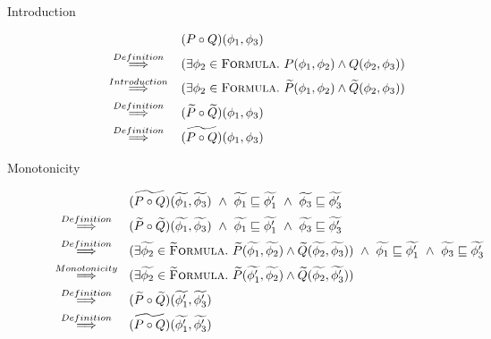 \begin{proofatend}~
    \begin{description}
        \item[Introduction] 
        \begin{align*}
        &(P \circ Q)(\phi_1, \phi_3)\\
        \overset{Definition}{~\quad\quad\implies\quad\quad~}
        &(\exists \phi_2 \in \textup{\textsc{Formula}}.~ P(\phi_1, \phi_2) \wedge Q(\phi_2, \phi_3))\\
        \overset{Introduction}{~\quad\quad\implies\quad\quad~}
        &(\exists \phi_2 \in \textup{\textsc{Formula}}.~ \widetilde{P}(\phi_1, \phi_2) \wedge \widetilde{Q}(\phi_2, \phi_3))\\
        \overset{Definition}{~\quad\quad\implies\quad\quad~}
        &(\widetilde{P} \circ \widetilde{Q})(\phi_1, \phi_3)\\
        \overset{Definition}{~\quad\quad\implies\quad\quad~}
        &\widetilde{(P \circ Q)}(\phi_1, \phi_3)\\
        \end{align*}
        
        \item[Monotonicity] 
        \begin{align*}
        &\widetilde{(P \circ Q)}(\widetilde{\phi_1}, \widetilde{\phi_3}) ~\wedge~ \widetilde{\phi_1} \sqsubseteq \widetilde{\phi_1'} ~\wedge~ \widetilde{\phi_3} \sqsubseteq \widetilde{\phi_3'}\\
        \overset{Definition}{~\quad\quad\implies\quad\quad~}
        &(\widetilde{P} \circ \widetilde{Q})(\widetilde{\phi_1}, \widetilde{\phi_3}) ~\wedge~ \widetilde{\phi_1} \sqsubseteq \widetilde{\phi_1'} ~\wedge~ \widetilde{\phi_3} \sqsubseteq \widetilde{\phi_3'}\\
        \overset{Definition}{~\quad\quad\implies\quad\quad~}
        &(\exists \widetilde{\phi_2} \in \textup{\textsc{\ensuremath{\widetilde{\text{F}}}ormula}}.~ \widetilde{P}(\widetilde{\phi_1}, \widetilde{\phi_2}) \wedge \widetilde{Q}(\widetilde{\phi_2}, \widetilde{\phi_3})) ~\wedge~ \widetilde{\phi_1} \sqsubseteq \widetilde{\phi_1'} ~\wedge~ \widetilde{\phi_3} \sqsubseteq \widetilde{\phi_3'}\\
        \overset{Monotonicity}{~\quad\quad\implies\quad\quad~}
        &(\exists \widetilde{\phi_2} \in \textup{\textsc{\ensuremath{\widetilde{\text{F}}}ormula}}.~ \widetilde{P}(\widetilde{\phi_1'}, \widetilde{\phi_2}) \wedge \widetilde{Q}(\widetilde{\phi_2}, \widetilde{\phi_3'}))\\
        \overset{Definition}{~\quad\quad\implies\quad\quad~}
        &(\widetilde{P} \circ \widetilde{Q})(\widetilde{\phi_1'}, \widetilde{\phi_3'})\\
        \overset{Definition}{~\quad\quad\implies\quad\quad~}
        &\widetilde{(P \circ Q)}(\widetilde{\phi_1'}, \widetilde{\phi_3'})\\
        \end{align*}
    \end{description}
\end{proofatend}

